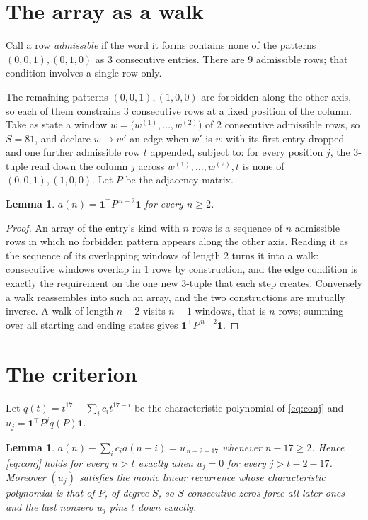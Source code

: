 \documentclass[11pt,a4paper]{article}
\theoremstyle{plain}
\newtheorem{lemma}[theorem]{Lemma}
\theoremstyle{definition}
\begin{document}
\section{The array as a walk}

Call a row \emph{admissible} if the word it forms contains none of the patterns
$(0,0,1), (0,1,0)$ as $3$ consecutive entries. There are $9$ admissible rows; that condition
involves a single row only.

The remaining patterns $(0,0,1), (1,0,0)$ are forbidden along the other axis, so each of them
constrains $3$ consecutive rows at a fixed position of the column. Take as state a
window $w=\bigl(w^{(1)},\dots,w^{(2)}\bigr)$ of $2$ consecutive admissible
rows, so $S=81$, and declare $w\to w'$ an edge when $w'$ is $w$ with its first entry
dropped and one further admissible row $t$ appended, subject to: for every position
$j$, the $3$-tuple read down the column $j$ across $w^{(1)},\dots,w^{(2)},t$
is none of $(0,0,1), (1,0,0)$. Let $P$ be the adjacency matrix.

\begin{lemma}\label{lem:walk}
$a(n)=\mathbf{1}^{\!\top}P^{\,n-2}\mathbf{1}$ for every $n\ge2$.
\end{lemma}

\begin{proof}
An array of the entry's kind with $n$ rows is a sequence of $n$ admissible rows in
which no forbidden pattern appears along the other axis. Reading it as the sequence of its
overlapping windows of length $2$ turns it into a walk: consecutive windows overlap in
$1$ rows by construction, and the edge condition is exactly the requirement on the one
new $3$-tuple that each step creates. Conversely a walk reassembles into such an array,
and the two constructions are mutually inverse. A walk of length $n-2$ visits $n-1$
windows, that is $n$ rows; summing over all starting and ending states gives
$\mathbf{1}^{\!\top}P^{\,n-2}\mathbf{1}$.
\end{proof}

\section{The criterion}

Let $q(t)=t^{17}-\sum_i c_i t^{17-i}$ be the characteristic polynomial of
\eqref{eq:conj} and $u_j=\mathbf{1}^{\!\top}P^{j}q(P)\mathbf{1}$.

\begin{lemma}\label{lem:crit}
$a(n)-\sum_i c_i a(n-i)=u_{\,n-2-17}$ whenever $n-17\ge2$. Hence
\eqref{eq:conj} holds for every $n>t$ exactly when $u_j=0$ for every
$j>t-2-17$. Moreover $(u_j)$ satisfies the monic linear recurrence whose
characteristic polynomial is that of $P$, of degree $S$, so $S$ consecutive zeros force all
later ones and the last nonzero $u_j$ pins $t$ down exactly.
\end{lemma}
\end{document}
